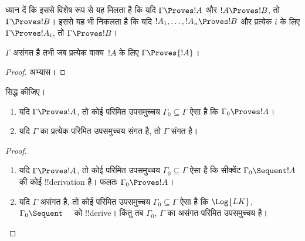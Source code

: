 \documentclass[../../../include/open-logic-section]{subfiles}
\begin{document}
ध्यान दें कि इससे विशेष रूप से यह मिलता है कि यदि $\Gamma \Proves !A$ और
$!A \Proves !B$, तो $\Gamma \Proves !B$। इससे यह भी निकलता है कि यदि
$!A_1, \dots, !A_n \Proves !B$ और प्रत्येक $i$ के लिए
$\Gamma \Proves !A_i$, तो $\Gamma \Proves !B$।

\begin{prop}
$\Gamma$ असंगत है तभी जब प्रत्येक वाक्य~$!A$ के लिए
$\Gamma \Proves {!A}$।
\end{prop}

\begin{proof}
अभ्यास।
\end{proof}

\begin{prob}
 सिद्ध कीजिए।
\end{prob}

\begin{prop}[संहतता]
  \begin{enumerate}
  \item यदि $\Gamma \Proves !A$, तो कोई परिमित उपसमुच्चय
    $\Gamma_0 \subseteq \Gamma$ ऐसा है कि $\Gamma_0 \Proves !A$।
  \item यदि $\Gamma$ का प्रत्येक परिमित उपसमुच्चय संगत है, तो $\Gamma$
    संगत है।
  \end{enumerate}
\end{prop}

\begin{proof}
  \begin{enumerate}
    \item यदि $\Gamma \Proves !A$, तो कोई परिमित उपसमुच्चय
      $\Gamma_0 \subseteq \Gamma$ ऐसा है कि सीक्वेंट
      $\Gamma_0 \Sequent !A$ की कोई !!{derivation} है। फलतः
      $\Gamma_0 \Proves !A$।
    \item यदि $\Gamma$ असंगत है, तो कोई परिमित उपसमुच्चय
      $\Gamma_0 \subseteq \Gamma$ ऐसा है कि $\Log{LK}$,
      $\Gamma_0 \Sequent \quad$ को !!{derive}। किंतु तब
      $\Gamma_0$, $\Gamma$ का असंगत परिमित उपसमुच्चय है।
  \end{enumerate}
\end{proof}
\end{document}
